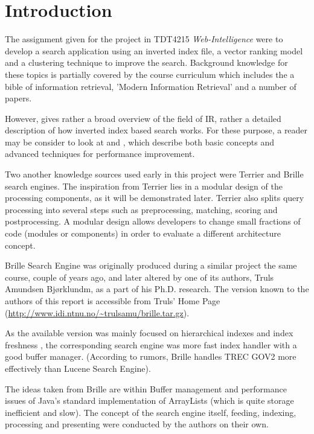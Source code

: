 \chapter{Introduction}
\thispagestyle{fancy}
\label{sec:introduction}

The assignment given for the project in TDT4215 {\it Web-Intelligence} were to develop a search application using an inverted index file, a vector ranking model and a clustering technique to improve the search. Background knowledge for these topics is partially covered by the course curriculum which includes the a bible of information retrieval, 'Modern Information Retrieval' \cite{553876} and a number of papers.

However, \cite{553876} gives rather a broad overview of the field of IR, rather a detailed description of how inverted index based search works. For these purpose, a reader may be consider to look at \cite{1132959} and \cite{323905}, which describe both basic concepts and advanced techniques for performance improvement.

Two another knowledge sources used early in this project were Terrier \cite{ounis06terrier-osir} and Brille \cite{truls} search engines. The inspiration from Terrier lies in a modular design of the processing components, as it will be demonstrated later. Terrier also splits query processing into several steps such as preprocessing, matching, scoring and postprocessing. A modular design allows developers to change small fractions of code (modules or components) in order to evaluate a different architecture concept.

Brille Search Engine was originally produced during a similar project the same course, couple of years ago, and later altered by one of its authors, Truls Amundsen Bjørklundm, as a part of his Ph.D. research. The version known to the authors of this report is accessible from Truls' Home Page (\url{http://www.idi.ntnu.no/~trulsamu/brille.tar.gz}).

As the available version was mainly focused on hierarchical indexes and index freshness \cite{truls}, the corresponding search engine was more fast index handler with a good buffer manager. (According to rumors, Brille handles TREC GOV2 more effectively than Lucene Search Engine).

The ideas taken from Brille are within Buffer management and performance issues of Java's standard implementation of ArrayLists (which is quite storage inefficient and slow). The concept of the search engine itself, feeding, indexing, processing and presenting were conducted by the authors on their own.

